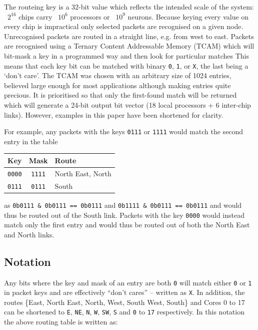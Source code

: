 \documentclass[conference]{IEEEtran}
\newcommand{\mytt}[1]{\texttt{\footnotesize#1}}
\begin{document}
  The routeing key is a 32-bit value which reflects the intended scale of the system: ~$2^16$ chips carry ~$10^6$ processors or ~$10^9$ neurons.
  Because keying every value on every chip is impractical only selected packets are recognised on a given node.
  Unrecognised packets are routed in a straight line, e.g. from west to east.
  Packets are recognised using a Ternary Content Addressable Memory (TCAM) which will bit-mask a key in a programmed way and then look for particular matches
  This means that each key bit can be matched with binary \mytt{0}, \mytt{1}, or \mytt{X}, the last being a `don't care'.
  The TCAM was chosen with an arbitrary size of 1024 entries, believed large enough for most applications although making entries quite precious.
  It is prioritised so that only the first-found match will be returned which will generate a 24-bit output bit vector (18 local processors + 6 inter-chip links).
  However, examples in this paper have been shortened for clarity.

  For example, any packets with the keys \mytt{0111} or \mytt{1111} would match the second entry in the table

  \begin{table}[H]
    \centering
    \begin{tabular}{c c l}
      \toprule
      Key & Mask & Route \\
      \midrule
      \texttt{0000} & \texttt{1111} & North East, North \\
      \texttt{0111} & \texttt{0111} & South \\
      \bottomrule
    \end{tabular}
  \end{table}

  \noindent as \mytt{0b0111 \& 0b0111 == 0b0111} and \mytt{0b1111 \& 0b0111 == 0b0111} and would thus be routed out of the South link.
  Packets with the key \mytt{0000} would instead match only the first entry and would thus be routed out of both the North East and North links.

  \subsection{Notation}

  Any bits where the key and mask of an entry are both \mytt{0} will match either \mytt{0} or \mytt{1} in packet keys and are effectively ``don't cares'' -- written as \mytt{X}.
  In addition, the routes \{East, North East, North, West, South West, South\} and Cores 0 to 17 can be shortened to \mytt{E}, \mytt{NE}, \mytt{N}, \mytt{W}, \mytt{SW}, \mytt{S} and \mytt{0} to \mytt{17} respectively.
  In this notation the above routing table is written as:
\end{document}
